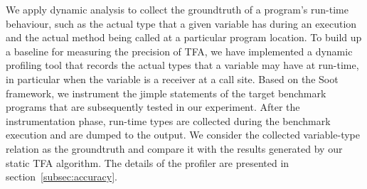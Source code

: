 \documentclass{fac}
\begin{document}
We apply dynamic analysis to collect the groundtruth of a program's run-time behaviour, such as the actual type that a given variable has during an execution and the actual method being called at a particular program location. To build up a baseline for measuring the precision of TFA, we have implemented a dynamic profiling tool that records the actual types that a variable may have at run-time, in particular when the variable is a receiver at a call site. Based on the Soot framework, we instrument the jimple statements of the target benchmark programs that are subsequently tested in our experiment. After the instrumentation phase, run-time types are collected during the benchmark execution and are dumped to the output. We consider the collected variable-type relation as the groundtruth and compare it with the results generated by our static TFA algorithm. The details of the profiler are presented in section~\ref{subsec:accuracy}. %
%
%
%
%
\end{document}
